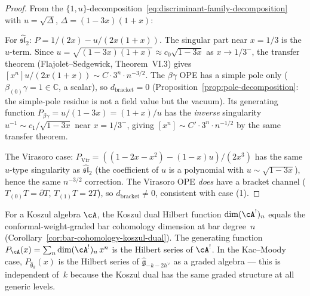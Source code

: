 \begin{proof}
From the $\{1, u\}$-decomposition~\eqref{eq:discriminant-family-decomposition}
with $u = \sqrt{\Delta}$, $\Delta = (1{-}3x)(1{+}x)$:

For $\widehat{\mathfrak{sl}}_2$: $P = 1/(2x) - u/(2x(1{+}x))$.
The singular part near $x = 1/3$ is the $u$-term.  Since
$u = \sqrt{(1{-}3x)(1{+}x)} \approx c_0\sqrt{1{-}3x}$ as $x \to 1/3^-$,
the transfer theorem (Flajolet--Sedgewick, Theorem~VI.3) gives
$[x^n] u/(2x(1{+}x)) \sim C \cdot 3^n \cdot n^{-3/2}$.
The $\beta\gamma$ OPE has a simple pole only
($\beta_{(0)}\gamma = 1 \in \mathbb{C}$, a scalar),
so $d_{\mathrm{bracket}} = 0$
(Proposition~\ref{prop:pole-decomposition}: the simple-pole residue is
not a field value but the vacuum).
Its generating function $P_{\beta\gamma} = u/(1{-}3x) = (1{+}x)/u$
has the \emph{inverse} singularity $u^{-1} \sim c_1 / \sqrt{1{-}3x}$
near $x = 1/3^-$, giving $[x^n] \sim C' \cdot 3^n \cdot n^{-1/2}$
by the same transfer theorem.

The Virasoro case: $P_{\mathrm{Vir}} = ((1{-}2x{-}x^2) - (1{-}x)u)/(2x^3)$
has the same $u$-type singularity as $\widehat{\mathfrak{sl}}_2$
(the coefficient of $u$ is a polynomial with $u \sim \sqrt{1{-}3x}$),
hence the same $n^{-3/2}$ correction.
The Virasoro OPE \emph{does} have a bracket channel
($T_{(0)}T = \partial T$, $T_{(1)}T = 2T$),
so $d_{\mathrm{bracket}} \neq 0$, consistent with case (1).
\end{proof}

\begin{remark}\label{rem:bar-hilbert-koszul-dual}
For a Koszul algebra $\cA$, the Koszul dual Hilbert function $\dim (\cA^!)_n$ equals the conformal-weight-graded bar cohomology dimension at bar degree~$n$ (Corollary~\ref{cor:bar-cohomology-koszul-dual}).  The generating function $P_{\cA}(x) = \sum_n \dim (\cA^!)_n\, x^n$ is the Hilbert series of $\cA^!$.  In the Kac--Moody case, $P_{\widehat{\mathfrak{g}}_k}(x)$ is the Hilbert series of $\widehat{\mathfrak{g}}_{-k-2h^\vee}$ as a graded algebra --- this is independent of~$k$ because the Koszul dual has the same graded structure at all generic levels.
\end{remark}

